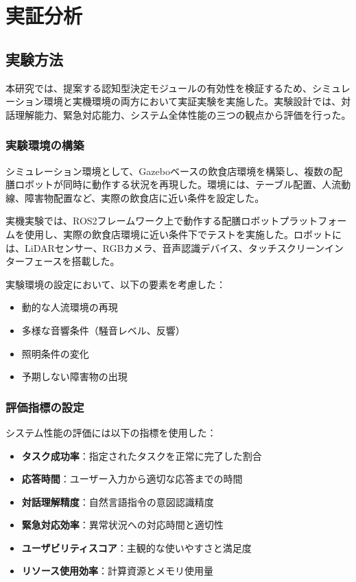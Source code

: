 \documentclass[12pt]{report}
\begin{document}
\chapter{実証分析}
\label{chap:analysis}

\section{実験方法}
\label{sec:methodology}

本研究では、提案する認知型決定モジュールの有効性を検証するため、シミュレーション環境と実機環境の両方において実証実験を実施した。実験設計では、対話理解能力、緊急対応能力、システム全体性能の三つの観点から評価を行った。

\subsection{実験環境の構築}
\label{subsec:experimental_setup}

シミュレーション環境として、Gazeboベースの飲食店環境を構築し、複数の配膳ロボットが同時に動作する状況を再現した。環境には、テーブル配置、人流動線、障害物配置など、実際の飲食店に近い条件を設定した。

実機実験では、ROS2フレームワーク上で動作する配膳ロボットプラットフォームを使用し、実際の飲食店環境に近い条件下でテストを実施した。ロボットには、LiDARセンサー、RGBカメラ、音声認識デバイス、タッチスクリーンインターフェースを搭載した。

実験環境の設定において、以下の要素を考慮した：
\begin{itemize}
  \item 動的な人流環境の再現
  \item 多様な音響条件（騒音レベル、反響）
  \item 照明条件の変化
  \item 予期しない障害物の出現
\end{itemize}

\subsection{評価指標の設定}
\label{subsec:evaluation_metrics}

システム性能の評価には以下の指標を使用した：

\begin{itemize}
  \item \textbf{タスク成功率}：指定されたタスクを正常に完了した割合
  \item \textbf{応答時間}：ユーザー入力から適切な応答までの時間
  \item \textbf{対話理解精度}：自然言語指令の意図認識精度
  \item \textbf{緊急対応効率}：異常状況への対応時間と適切性
  \item \textbf{ユーザビリティスコア}：主観的な使いやすさと満足度
  \item \textbf{リソース使用効率}：計算資源とメモリ使用量
\end{itemize}
\end{document}
